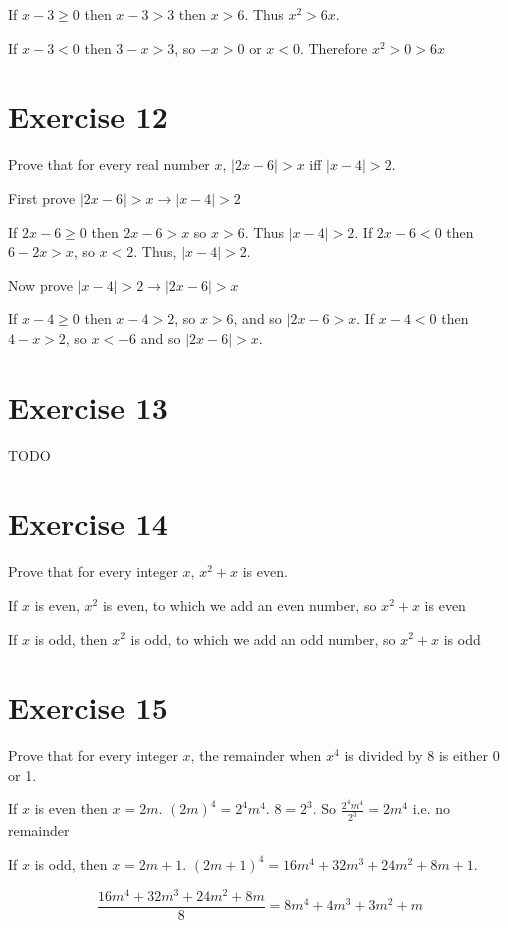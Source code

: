 \documentclass[11pt]{article}
\newcommand{\then}{\rightarrow}
\begin{document}
If $x - 3 \geq 0$ then $x - 3 > 3$ then $x > 6$. Thus $x^2 > 6x$.

If $x - 3 < 0$ then $3 - x > 3$, so $-x > 0$ or $x < 0$. Therefore 
$x^2 > 0 > 6x$

\section*{Exercise 12}

Prove that for every real number $x$, $| 2x - 6 | > x$ iff $| x - 4 | > 2$.

First prove $| 2x - 6 | > x \then | x - 4 | > 2$

If $2x - 6 \geq 0$ then $2x - 6 > x$ so $x > 6$. Thus $| x - 4 | > 2$. If 
$2x - 6 < 0$ then $6 - 2x > x$, so $x < 2$. Thus, $| x - 4 | > 2$.

Now prove $| x - 4 | > 2 \then | 2x - 6 | > x$

If $x - 4 \geq 0$ then $x - 4 > 2$, so $x > 6$, and so $| 2x - 6 > x$.
If $x - 4 < 0$ then $4 - x > 2$, so $x < -6$ and so $| 2x - 6 | > x$.

\section*{Exercise 13}

TODO

\section*{Exercise 14}

Prove that for every integer $x$, $x^2 + x$ is even.

If $x$ is even, $x^2$ is even, to which we add an even number, so $x^2+x$ is even

If $x$ is odd, then $x^2$ is odd, to which we add an odd number, so $x^2+x$ is odd

\section*{Exercise 15}

Prove that for every integer $x$, the remainder when $x^4$ is divided by 8 is 
either 0 or 1.

If $x$ is even then $x = 2m$. $(2m)^4 = 2^4 m^4$. $8 = 2^3$. So 
$\frac{2^4 m^4}{2^3} = 2m^4$ i.e. no remainder 

If $x$ is odd, then $x = 2m + 1$. 
$(2m + 1)^4 = 16m^4 + 32m^3 + 24m^2 + 8m + 1$. 

$$\frac{16m^4 + 32m^3 + 24m^2 + 8m}{8} = 8m^4 + 4m^3 + 3m^2 + m$$
\end{document}
